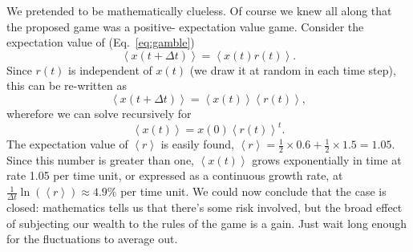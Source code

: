 \documentclass[a4paper]{article}
\newcommand{\ave}[1]{\left\langle#1 \right\rangle}
\newcommand{\eref}[1]{(Eq.~\ref{eq:#1})}
\newcommand{\be}{\begin{equation}}
\newcommand{\ee}{\end{equation}}
\begin{document}
We pretended to be mathematically clueless. Of course we knew all along that the proposed game was a positive-
expectation 
value
game. Consider the expectation value of \eref{gamble}  
\be
\ave{x(t+\Delta t)}=\ave{x(t) r(t)}. 
\ee
Since $r(t)$ is independent of $x(t)$ (we draw it at random in each time step), this can be re-written as
\be
\ave{x(t+\Delta t)}=\ave{x(t)}\ave{r(t)},
\ee
wherefore we can solve recursively for
\be
\ave{x(t)}=x(0)\ave{r(t)}^t.
\ee
The expectation value of $\ave{r}$ is easily found, $\ave{r}=\frac{1}{2}\times 0.6 + \frac{1}{2}\times 1.5=1.05$. Since 
this number is greater than one, $\ave{x(t)}$ grows exponentially in time at rate 1.05 per time unit, or expressed as a 
continuous growth rate, at $\frac{1}{\Delta t}\ln(\ave{r})\approx4.9\%$ per time unit. We could now conclude that the 
case is closed: mathematics tells us that there's some risk involved, but the broad effect of subjecting our 
wealth to the rules of the game is a gain. Just wait long enough for the fluctuations to average out. 
\end{document}
